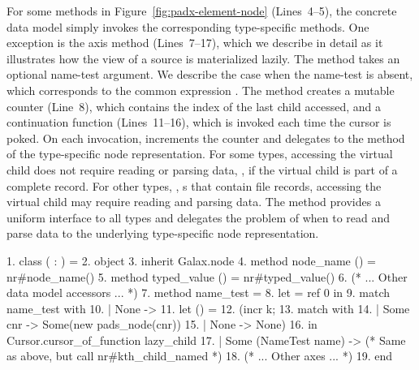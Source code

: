For some methods in Figure~\ref{fig:padx-element-node} (Lines~4--5),
the concrete data model simply invokes the corresponding type-specific
methods.  One exception is the  axis method (Lines~7--17),
which we describe in detail as it illustrates how the \Xml{} view of a
\pads{} source is materialized lazily.
The  method takes an optional name-test argument.  We
describe the case when the name-test is absent, which corresponds to
the common expression .  The  method creates a
mutable counter  (Line~8), which contains the index of the
last child accessed, and a continuation function  (Lines~11--16),
which is invoked each time the  cursor is poked.  On each
invocation,  increments the counter and delegates to
the  method of the type-specific node representation.
For some \pads{} types, accessing the virtual  child does not
require reading or parsing data, \eg{}, if the virtual child is part of
a complete \pads{} record.  For other \pads{} types, \eg{}, s that
contain file records, accessing the virtual  child may require
reading and parsing data.  The  method provides a
uniform interface to all types and delegates the problem of when to
read and parse data to the underlying type-specific node
representation.
\begin{figure*}
\begin{small}
\begin{code}
{ 1}. class  ( : ) =  
{ 2}. object 
{ 3}.   inherit Galax.node
{ 4}.   method node\_name   () = nr#node\_name()
{ 5}.   method typed\_value () = nr#typed_value() 
{ 6}.   (* ... Other data model accessors ... *)
{ 7}.   method  name\_test =  
{ 8}.     let  = ref 0 in
{ 9}.     match name\_test with 
{10}.     | None ->  
{11}.       let  () = 
{12}.        (incr k;
{13}.         match   with
{14}.         | Some cnr ->  Some(new pads\_node(cnr))
{15}.         | None -> None)
{16}.       in Cursor.cursor\_of\_function lazy\_child
{17}.     | Some (NameTest name) -> 
            (* Same as above, but call nr#kth\_child\_named *)
{18}.   (* ... Other axes ... *)
{19}. end
\end{code}
\end{small}
\caption{Fragment of the \padx{} concrete data model}
\label{fig:padx-element-node}
\end{figure*}

